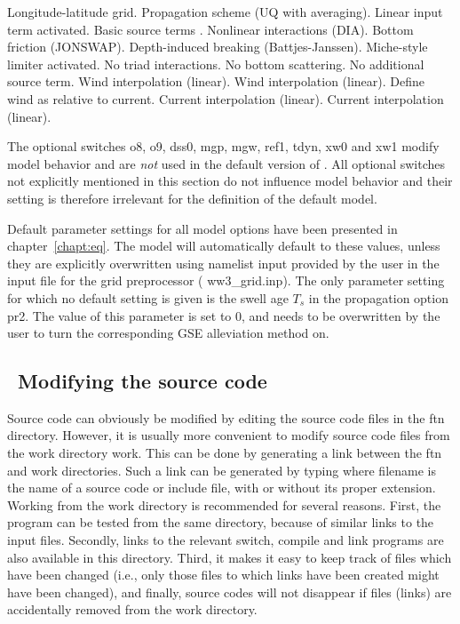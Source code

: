 \begin{slist}
  {Longitude-latitude grid.}
  {Propagation scheme (UQ with averaging).}
  {Linear input term activated.}
  {Basic source terms \citep{tol:JPO96}.}
  {Nonlinear interactions (DIA).}
  {Bottom friction (JONSWAP).}
  {Depth-induced breaking (Battjes-Janssen).}
 {Miche-style limiter activated.}
  {No triad interactions.}
  {No bottom scattering.}
  {No additional source term.}
 {Wind interpolation (linear).}
 {Wind interpolation (linear).}
 {Define wind as relative to current.}
 {Current interpolation (linear).}
 {Current interpolation (linear).}
\end{slist}

\noindent
The optional switches {\sc o8}, {\sc o9}, {\sc dss0}, {\sc mgp}, {\sc mgw},
{\sc ref1}, {\sc tdyn}, {\sc xw0} and {\sc xw1} modify model behavior and are {\it not}
used in the default version of \ws. All optional switches not explicitly
mentioned in this section do not influence model behavior and their setting is
therefore irrelevant for the definition of the default model.

Default parameter settings for all model options have been presented in
chapter~\ref{chapt:eq}. The model will automatically default to these values,
unless they are explicitly overwritten using {\F namelist} input provided by
the user in the input file for the grid preprocessor ({\file
ww3\_grid.inp}). The only parameter setting for which no default setting is
given is the swell age $T_s$ in the propagation option {\sc pr2}. The value of
this parameter is set to 0, and needs to be overwritten by the user to turn
the corresponding GSE alleviation method on.


\vssub
\subsection{~Modifying the source code} \label{sec:mod}
\vssub

Source code can obviously be modified by editing the source code files in the
{\dir ftn} directory. However, it is usually more convenient to modify source
code files from the work directory {\dir work}. This can be done by generating
a link between the {\dir ftn} and {\dir work} directories. Such a link can be
generated by typing  where {\code filename} is the name
of a source code or include file, with or without its proper
extension. Working from the work directory is recommended for several
reasons. First, the program can be tested from the same directory, because of
similar links to the input files. Secondly, links to the relevant switch,
compile and link programs are also available in this directory. Third, it
makes it easy to keep track of files which have been changed (i.e., only those
files to which links have been created might have been changed), and finally,
source codes will not disappear if files (links) are accidentally removed from
the work directory.

